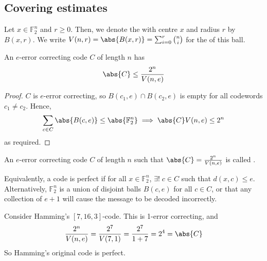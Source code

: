 \subsection{Covering estimates}
\begin{definition}
    Let $x \in \mathbb F_2^n$ and $r \geq 0$.
    Then, we denote the  with centre $x$ and radius $r$ by $B(x,r)$.
    We write $V(n,r) = \abs{B(x,r)} = \sum_{i=0}^r \binom{n}{i}$ for the  of this ball.
\end{definition}

\begin{lemma}
    An $e$-error correcting code $C$ of length $n$ has
    \begin{align*}
        \abs{C} \leq \frac{2^n}{V(n,e)}
    \end{align*}
\end{lemma}

\begin{proof}
    $C$ is $e$-error correcting, so $B(c_1, e) \cap B(c_2, e)$ is empty for all codewords $c_1 \neq c_2$.
    Hence,
    \begin{align*}
        \sum_{c \in C} \abs{B(c,e)}  \leq \abs{\mathbb F_2^n} \implies \abs{C} V(n,e) \leq 2^n
    \end{align*}
    as required.
\end{proof}

\begin{definition}
    An $e$-error correcting code $C$ of length $n$ such that $\abs{C} = \frac{2^n}{V(n,e)}$ is called .
\end{definition}

\begin{remark}
    Equivalently, a code is perfect if for all $x \in \mathbb F_2^n$, $\exists! \; c \in C$ such that $d(x,c) \leq e$.
    Alternatively, $\mathbb F_2^n$ is a union of disjoint balls $B(c,e)$ for all $c \in C$, or that any collection of $e + 1$ will cause the message to be decoded incorrectly.
\end{remark}

\begin{example}
    Consider Hamming's $[7,16,3]$-code.
    This is 1-error correcting, and
    \begin{align*}
        \frac{2^n}{V(n,e)} = \frac{2^7}{V(7,1)} = \frac{2^7}{1+7} = 2^4 = \abs{C}
    \end{align*}
    So Hamming's original code is perfect.
\end{example}

